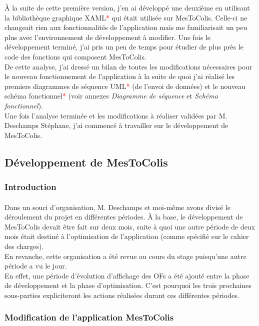 \documentclass[a4paper,12pt]{extarticle}
\newcommand{\alinea}{\hspace*{0.4cm}}
\begin{document}
À la suite de cette première version, j’en ai développé une deuxième en utilisant la bibliothèque graphique XAML\textcolor{red}{*} qui était utilisée sur MesToColis. Celle-ci ne changeait rien aux fonctionnalités de l’application mais me familiarisait un peu plus avec l’environnement de développement à modifier. Une fois le développement terminé, j’ai pris un peu de temps pour étudier de plus près le code des fonctions qui composent MesToColis.\\
\alinea
	De cette analyse, j’ai dressé un bilan de toutes les modifications nécessaires pour le nouveau fonctionnement de l’application à la suite de quoi j’ai réalisé les premiers diagrammes de séquence UML\textcolor{red}{*} (de l'envoi de données) et le nouveau schéma fonctionnel\textcolor{red}{*} (voir annexes \emph{Diagramme de séquence} et \emph{Schéma fonctionnel}).\\
Une fois l’analyse terminée et les modifications à réaliser validées par M. Deschamps Stéphane, j’ai commencé à travailler sur le développement de MesToColis.
	
	\subsection{Développement de MesToColis}
	\subsubsection{Introduction}
		\paragraph{}
	
	Dans un souci d’organisation, M. Deschamps et moi-même avons divisé le déroulement du projet en différentes périodes. À la base, le développement de MesToColis devait être fait sur deux mois, suite à quoi une autre période de deux mois était destiné à l’optimisation de l’application (comme spécifié sur le cahier des charges).\\
En revanche, cette organisation a été revue au cours du stage puisqu’une autre période a vu le jour.\\
En effet, une période d’évolution d’affichage des OFs a été ajouté entre la phase de développement et la phase d’optimisation. C’est pourquoi les trois prochaines sous-parties expliciteront les actions réalisées durant ces différentes périodes.
	
	\subsubsection{Modification de l’application MesToColis}
\end{document}
